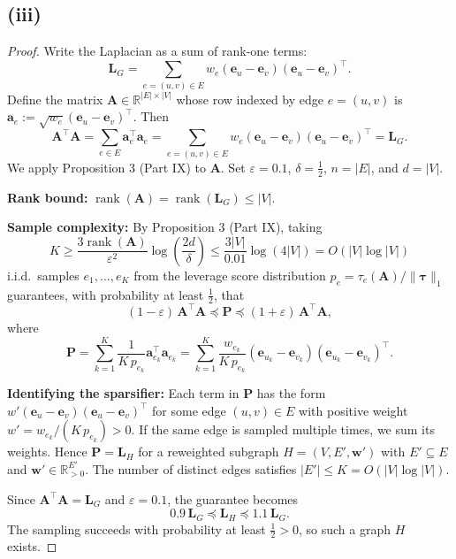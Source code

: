 \documentclass[12pt]{article}
\begin{document}
\subsection*{(iii)}
\begin{proof}
Write the Laplacian as a sum of rank-one terms:
\[
\mathbf{L}_G = \sum_{e = (u,v) \in E} w_e (\mathbf{e}_u - \mathbf{e}_v)(\mathbf{e}_u - \mathbf{e}_v)^\top.
\]
Define the matrix $\mathbf{A} \in \mathbb{R}^{|E| \times |V|}$ whose row indexed by edge $e = (u,v)$ is $\mathbf{a}_e := \sqrt{w_e}(\mathbf{e}_u - \mathbf{e}_v)^\top$. Then
\[
\mathbf{A}^\top \mathbf{A} = \sum_{e \in E} \mathbf{a}_e^\top \mathbf{a}_e = \sum_{e = (u,v) \in E} w_e (\mathbf{e}_u - \mathbf{e}_v)(\mathbf{e}_u - \mathbf{e}_v)^\top = \mathbf{L}_G.
\]
We apply Proposition 3 (Part IX) to $\mathbf{A}$. Set $\varepsilon = 0.1$, $\delta = \tfrac{1}{2}$, $n = |E|$, and $d = |V|$.

\textbf{Rank bound:} $\operatorname{rank}(\mathbf{A}) = \operatorname{rank}(\mathbf{L}_G) \leq |V|$.

\textbf{Sample complexity:} By Proposition 3 (Part IX), taking
\[
K \geq \frac{3 \operatorname{rank}(\mathbf{A})}{\varepsilon^2} \log\!\left(\frac{2d}{\delta}\right) \leq \frac{3|V|}{0.01} \log(4|V|) = O(|V| \log |V|)
\]
i.i.d.\ samples $e_1, \ldots, e_K$ from the leverage score distribution $p_e = \tau_e(\mathbf{A}) / \|\boldsymbol{\tau}\|_1$ guarantees, with probability at least $\tfrac{1}{2}$, that
\[
(1 - \varepsilon)\,\mathbf{A}^\top \mathbf{A} \preceq \mathbf{P} \preceq (1 + \varepsilon)\,\mathbf{A}^\top \mathbf{A},
\]
where
\[
\mathbf{P} = \sum_{k=1}^{K} \frac{1}{K\, p_{e_k}} \mathbf{a}_{e_k}^\top \mathbf{a}_{e_k} = \sum_{k=1}^{K} \frac{w_{e_k}}{K\, p_{e_k}} (\mathbf{e}_{u_k} - \mathbf{e}_{v_k})(\mathbf{e}_{u_k} - \mathbf{e}_{v_k})^\top.
\]

\textbf{Identifying the sparsifier:} Each term in $\mathbf{P}$ has the form $w'(\mathbf{e}_u - \mathbf{e}_v)(\mathbf{e}_u - \mathbf{e}_v)^\top$ for some edge $(u,v) \in E$ with positive weight $w' = w_{e_k}/(K\, p_{e_k}) > 0$. If the same edge is sampled multiple times, we sum its weights. Hence $\mathbf{P} = \mathbf{L}_H$ for a reweighted subgraph $H = (V, E', \mathbf{w}')$ with $E' \subseteq E$ and $\mathbf{w}' \in \mathbb{R}_{>0}^{E'}$. The number of distinct edges satisfies $|E'| \leq K = O(|V| \log |V|)$.

Since $\mathbf{A}^\top \mathbf{A} = \mathbf{L}_G$ and $\varepsilon = 0.1$, the guarantee becomes
\[
0.9\, \mathbf{L}_G \preceq \mathbf{L}_H \preceq 1.1\, \mathbf{L}_G.
\]
The sampling succeeds with probability at least $\tfrac{1}{2} > 0$, so such a graph $H$ exists.
\end{proof}
\end{document}
